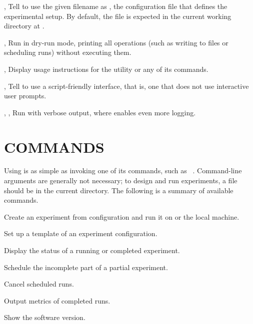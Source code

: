 \documentclass[a4paper,english]{article}
\begin{document}
\begin{adjustwidth}{18pt}{0pt}
        \begin{Description}[Options]
            \item[\OptArg{-c}{ filename}, \OptArg{--config}{ filename}]
            Tell  to use the given filename as , the configuration
            file that defines the experimental setup.
            By default, the file is expected in the current working directory at .
            \item[\Opt{-d}, \Opt{--dry-run}]
            Run  in dry-run mode, printing all operations (such as writing to files or scheduling runs)
            without executing them.
            \item[\Opt{-h}, \Opt{--help}]
            Display usage instructions for the  utility or any of its commands.
            \item[\Opt{-s}, \Opt{--script}]
            Tell  to use a script-friendly interface, that is, one that does not use
            interactive user prompts.
            \item[\Opt{-v}, \Opt{-vv}, \Opt{--verbose}]
            Run  with verbose output, where  enables even more logging.
        \end{Description}

    \section{COMMANDS}

        Using  is as simple as invoking one of its commands, such as
        ~.
        Command-line arguments are generally not necessary; to design and run
        experiments, a  file should be in the current directory.
        The following is a summary of available commands.

        \begin{Description}[Commands]
            \item[\Prog{gourd} \Arg{run}]
            Create an experiment from configuration and run it on  or the local machine.
            \item[\Prog{gourd} \Arg{init}]
            Set up a template of an experiment configuration.
            \item[\Prog{gourd} \Arg{status}]
            Display the status of a running or completed experiment.
            \item[\Prog{gourd} \Arg{continue}]
            Schedule the incomplete part of a partial experiment.
            \item[\Prog{gourd} \Arg{cancel}]
            Cancel scheduled runs.
            \item[\Prog{gourd} \Arg{analyse}]
            Output metrics of completed runs.
            \item[\Prog{gourd} \Arg{version}]
            Show the software version.
        \end{Description}


\end{adjustwidth}
\end{document}
